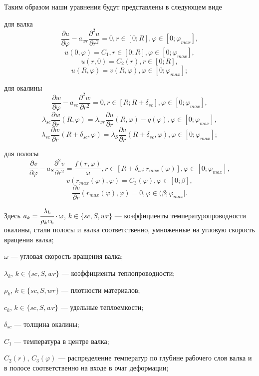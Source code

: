 Таким образом наши уравнения будут представлены в следующем виде

для валка
\begin{equation}
\frac{\partial u}{\partial \varphi} - a_{wr} \frac{\partial^2u}{\partial r^2} = 0, r \in [0; R], \varphi \in [0; \varphi_{max}],
\label{difur_wr}
\end{equation}
$$u(0,\varphi)=C_1, r \in [0; R], \varphi \in [0; \varphi_{max}],$$
$$u(r,0)=C_2(r), r \in [0; R],$$
$$u(R,\varphi)=v(R,\varphi), \varphi \in [0; \varphi_{max}];$$

для окалины
\begin{equation}
\frac{\partial w}{\partial \varphi} - a_{sc} \frac{\partial^2w}{\partial r^2} = 0, r \in [R; R+\delta_{sc}], \varphi \in [0; \varphi_{max}],
\label{difur_sc}
\end{equation}
$$\lambda_{sc} \frac{\partial w}{\partial r}(R,\varphi) = \lambda_{wr} \frac{\partial u}{\partial r}(R,\varphi) - q(\varphi), \varphi \in [0; \varphi_{max}],$$
$$\lambda_{sc} \frac{\partial w}{\partial r}(R+\delta_{sc},\varphi) = \lambda_{S} \frac{\partial v}{\partial r}(R+\delta_{sc},\varphi), \varphi \in [0; \varphi_{max}];$$

для полосы
\begin{equation}
\frac{\partial v}{\partial \varphi} - a_S \frac{\partial^2v}{\partial r^2} = \frac{f(r, \varphi)}{\omega}, r \in [R+\delta_{sc}; r_{max}(\varphi)], \varphi \in [0; \varphi_{max}],
\label{difur_S}
\end{equation}
$$v(r_{max}(\varphi), \varphi) = C_3(\varphi), \varphi \in [0; \beta],$$
$$\frac{\partial v}{\partial r}(r_{max}(\varphi), \varphi) = 0, \varphi \in (\beta; \varphi_{max}].$$

Здесь $a_k = \cfrac{\lambda_k}{\rho_k c_k}\cdot \omega $, $k \in \{sc, S, wr\}$ — коэффициенты температуропроводности окалины, стали полосы и валка соответственно, умноженные на угловую скорость вращения валка;

$\omega$ — угловая скорость вращения валка;

$\lambda_{k}$, $k \in \{sc, S, wr\}$ — коэффициенты теплопроводности;

$\rho_k$, $k \in \{sc, S, wr\}$ — плотности материалов; 

$c_k$, $k \in \{sc, S, wr\}$ — удельные теплоемкости;

$\delta_{sc}$ — толщина окалины; 

$C_1$ — температура в центре валка;

$C_2(r)$, $C_3(\varphi)$ — распределение температур по глубине рабочего слоя валка и в полосе соответственно на входе в очаг деформации; 

